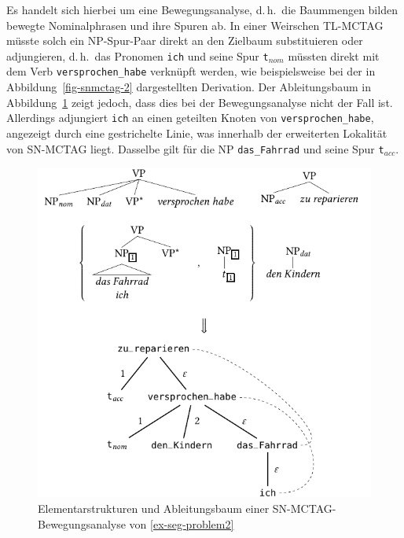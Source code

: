 Es handelt sich hierbei um eine Bewegungsanalyse, d.\,h.\ die Baummengen bilden bewegte Nominalphrasen und ihre Spuren ab. In einer Weirschen TL-MCTAG müsste solch ein NP-Spur-Paar direkt an den Zielbaum substituieren oder adjungieren, d.\,h.\ das Pronomen {\tt ich} und seine Spur {\tt t}$_{nom}$ müssten direkt mit dem Verb {\tt versprochen\_habe} verknüpft werden, wie beispielsweise bei der in Abbildung~\ref{fig-snmctag-2} dargestellten Derivation. Der Ableitungsbaum in Abbildung~\ref{fig-snmctag-1} zeigt jedoch, dass dies bei der Bewegungsanalyse nicht der Fall ist. Allerdings adjungiert {\tt ich} an einen geteilten Knoten von {\tt versprochen\_habe}, angezeigt durch eine gestrichelte Linie, was innerhalb der erweiterten Lokalität von SN-MCTAG liegt. Dasselbe gilt für die NP {\tt das\_Fahrrad} und seine Spur {\tt t}$_{acc}$.     

\begin{figure}[t]
\centering
\includegraphics{graphics/abb615.pdf}
\caption{Elementarstrukturen und Ableitungsbaum einer SN-MCTAG-Bewegungs\-analyse von \ref{ex-seg-problem2}\label{fig-snmctag-1}}
\end{figure}


